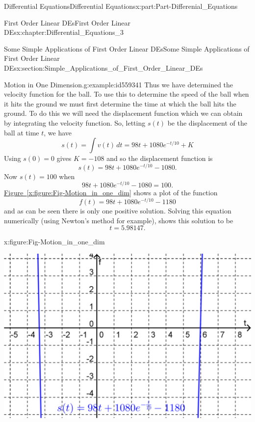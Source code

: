 \documentclass[oneside,10pt,]{book}
\newcommand{\xreffont}{\relax}
\numberwithin{equation}{section}
\begin{document}
\begin{partptx}{Differential Equations}{}{Differential Equations}{}{}{x:part:Part-Differenial_Equations}
\begin{chapterptx}{First Order Linear DEs}{}{First Order Linear DEs}{}{}{x:chapter:Differential_Equations_3}
\begin{sectionptx}{Some Simple Applications of First Order Linear DEs}{}{Some Simple Applications of First Order Linear DEs}{}{}{x:section:Simple_Applications_of_First_Order_Linear_DEs}
\begin{example}{Motion in One Dimension.}{g:example:id559341}
Thus we have determined the velocity function for the ball. To use this to determine the speed of the ball when it hits the ground we must first determine the time at which the ball hits the ground. To do this we will need the displacement function which we can obtain by integrating the velocity function. So, letting \(s(t)\) be the displacement of the ball at time \(t\), we have%
\begin{equation*}
s(t) = \int v(t) \, dt = 98t + 1080e^{-t/10} + K
\end{equation*}
Using \(s(0)=0\) gives \(K=-108\) and so the displacement function is%
\begin{equation*}
s(t) = 98t + 1080e^{-t/10} - 1080\text{.}
\end{equation*}
Now \(s(t) = 100\) when%
\begin{equation*}
98t + 1080e^{-t/10} - 1080 = 100\text{.}
\end{equation*}
\hyperref[x:figure:Fig-Motion_in_one_dim]{Figure~{\xreffont\ref{x:figure:Fig-Motion_in_one_dim}}} shows a plot of the function%
\begin{equation*}
f(t) = 98t + 1080e^{-t/10} - 1180
\end{equation*}
and as can be seen there is only one positive solution. Solving this equation numerically (using Newton’s method for example), shows this solution to be%
\begin{equation*}
t = 5.98147\text{.}
\end{equation*}
%
\begin{figureptx}{}{x:figure:Fig-Motion_in_one_dim}{}%
\begin{image}{0.15}{0.7}{0.15}%
\includegraphics[width=\linewidth]{./DifferentialEquations/Images/3/Fig3_motion_in_one_dim.png}

\end{image}
\end{figureptx}
\end{example}
\end{sectionptx}
\end{chapterptx}
\end{partptx}
\end{document}
